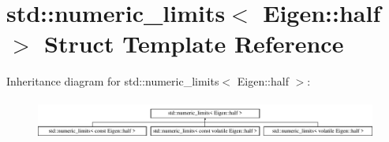 \hypertarget{structstd_1_1numeric__limits_3_01_eigen_1_1half_01_4}{}\section{std\+::numeric\+\_\+limits$<$ Eigen\+::half $>$ Struct Template Reference}
\label{structstd_1_1numeric__limits_3_01_eigen_1_1half_01_4}
Inheritance diagram for std\+::numeric\+\_\+limits$<$ Eigen\+::half $>$\+:\begin{figure}[H]
\begin{center}
\leavevmode
\includegraphics[height=1.314554cm]{structstd_1_1numeric__limits_3_01_eigen_1_1half_01_4}
\end{center}
\end{figure}
